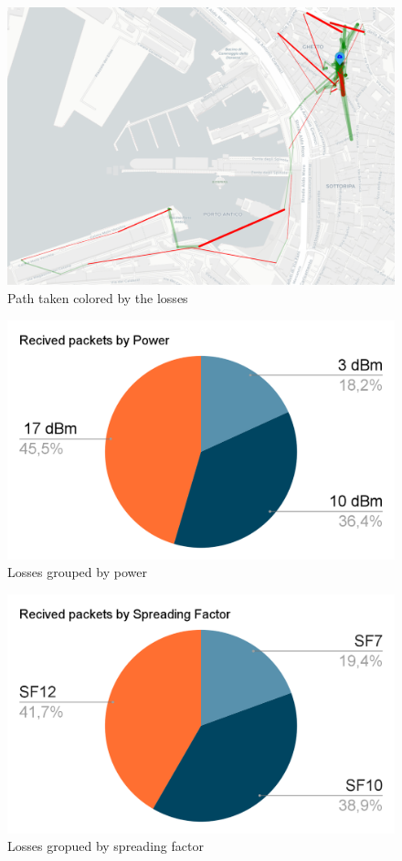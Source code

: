 \begin{figure}[htpb]
    \centering    
    \includegraphics[width=\linewidth]{coloredPath.png}
    \caption{Path taken colored by the losses}
    \label{chap:conc-colpath}
\end{figure}

\begin{figure}[htpb]
    \centering    
    \includegraphics[width=\linewidth]{recivedByPower.png}
    \caption{Losses grouped by power}
    \label{conc:recivedPow}
\end{figure}

\begin{figure}[htpb]
\includegraphics[width=\linewidth]{recivedBySpreading.png}
\caption{Losses gropued by spreading factor}
\label{conc:recivedSp}
\end{figure}

